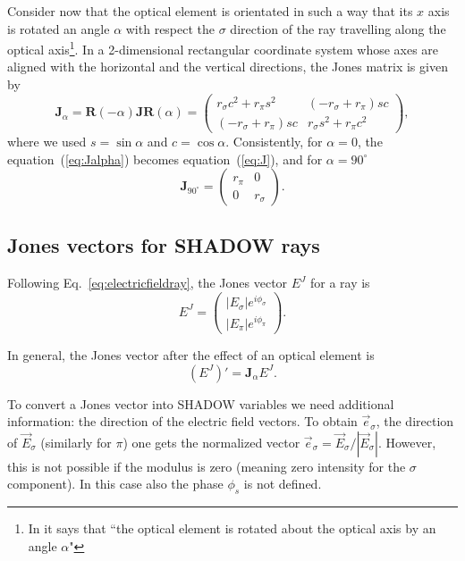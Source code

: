 \documentclass{iucr}
\begin{document}
Consider now that the optical element is orientated in such a way that its $x$ axis is rotated an angle $\alpha$ with respect the $\sigma$ direction of the ray travelling along the optical axis\footnote{
In \cite{LeClair} it says that ``the optical element is rotated about the optical axis by an angle $\alpha$"}.
In a 2-dimensional rectangular coordinate system whose axes are aligned with the horizontal and the vertical directions, the Jones matrix is given by
\begin{equation}\label{eq:Jalpha}
    \textbf{J}_\alpha = \textbf{R}(-\alpha) \textbf{J} \textbf{R}(\alpha)=
    \begin{pmatrix}
r_\sigma c^2 + r_\pi s^2 & (-r_\sigma + r_\pi) s c\\
(-r_\sigma + r_\pi) s c& 
r_\sigma s^2 + r_\pi c^2
\end{pmatrix},
\end{equation}
where we used $s=\sin\alpha$ and $c=\cos\alpha$. Consistently, for $\alpha=0$, the equation~(\ref{eq:Jalpha}) becomes equation~(\ref{eq:J}), and for $\alpha=90^\circ$
\begin{equation}\label{eq:J}
\textbf{J}_{90^\circ} = 
\begin{pmatrix}
r_\pi & 0\\
0 & r_\sigma
\end{pmatrix}.
\end{equation}
\subsection{Jones vectors for SHADOW rays}
\label{sec:JonesAndShadow}

Following Eq.~\ref{eq:electricfieldray}, the Jones vector $E^J$ for a ray is
\begin{equation}
    E^J = 
    \begin{pmatrix}
        |E_{\sigma}| e^{i \phi_\sigma} \\
        |E_{\pi}| e^{i \phi_\pi}
    \end{pmatrix}.
\end{equation}

In general, the Jones vector after the effect of an optical element is
\begin{equation}\label{eq:applyJones}
    (E^J)' = \textbf{J}_\alpha E^J.
\end{equation}

To convert a Jones vector into SHADOW variables we need additional information: the direction of the electric field vectors. To obtain $\vec{e}_\sigma$, the direction of $\vec{E}_\sigma$ (similarly for $\pi$) one gets the normalized vector $\vec{e}_\sigma=\vec{E}_\sigma/|\vec{E}_\sigma|$. However, this is not possible if the modulus is zero (meaning zero intensity for the $\sigma$ component). In this case also the phase $\phi_s$ is not defined. 
\end{document}
